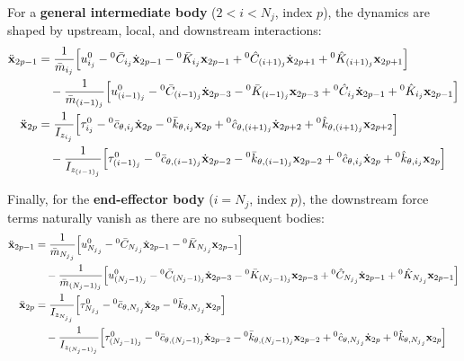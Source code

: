 \documentclass[11pt]{article}
\theoremstyle{definition}
\begin{document}
For a \textbf{general intermediate body} ($2 < i < N_j$, index $p$), the dynamics are shaped by upstream, local, and downstream interactions:
\begin{align}
    \ddot{\mathbf{x}}_{2p-1} &= 
    \frac{1}{\bar{m}_{i_j}} \Big[ u^0_{i_j} - {}^0\bar{C}_{i_j}\dot{\mathbf{x}}_{2p-1} - {}^0\bar{K}_{i_j}\mathbf{x}_{2p-1} + {}^0\hat{C}_{(i+1)_j}\dot{\mathbf{x}}_{2p+1} + {}^0\hat{K}_{(i+1)_j}\mathbf{x}_{2p+1} \Big] \notag \\
    &\quad - \frac{1}{\bar{m}_{(i-1)_j}} \Big[ u^0_{(i-1)_j} - {}^0\bar{C}_{(i-1)_j}\dot{\mathbf{x}}_{2p-3} - {}^0\bar{K}_{(i-1)_j}\mathbf{x}_{2p-3} + {}^0\hat{C}_{i_j}\dot{\mathbf{x}}_{2p-1} + {}^0\hat{K}_{i_j}\mathbf{x}_{2p-1} \Big] \\
    \ddot{\mathbf{x}}_{2p} &= 
    \frac{1}{I_{z_{i_j}}} \Big[ \tau^0_{i_j} - {}^0\bar{c}_{\theta,i_j}\dot{\mathbf{x}}_{2p} - {}^0\bar{k}_{\theta,i_j}\mathbf{x}_{2p} + {}^0\hat{c}_{\theta,(i+1)_j}\dot{\mathbf{x}}_{2p+2} + {}^0\hat{k}_{\theta,(i+1)_j}\mathbf{x}_{2p+2} \Big] \notag \\
    &\quad - \frac{1}{I_{z_{(i-1)_j}}} \Big[ \tau^0_{(i-1)_j} - {}^0\bar{c}_{\theta,(i-1)_j}\dot{\mathbf{x}}_{2p-2} - {}^0\bar{k}_{\theta,(i-1)_j}\mathbf{x}_{2p-2} + {}^0\hat{c}_{\theta,i_j}\dot{\mathbf{x}}_{2p} + {}^0\hat{k}_{\theta,i_j}\mathbf{x}_{2p} \Big]
\end{align}

Finally, for the \textbf{end-effector body} ($i = N_j$, index $p$), the downstream force terms naturally vanish as there are no subsequent bodies:
\begin{align}
    \ddot{\mathbf{x}}_{2p-1} &= 
    \frac{1}{\bar{m}_{{N_j}_j}} \Big[ u^0_{{N_j}_j} - {}^0\bar{C}_{{N_j}_j}\dot{\mathbf{x}}_{2p-1} - {}^0\bar{K}_{{N_j}_j}\mathbf{x}_{2p-1} \Big] \notag \\
    &\quad - \frac{1}{\bar{m}_{({N_j}-1)_j}} \Big[ u^0_{({N_j}-1)_j} - {}^0\bar{C}_{({N_j}-1)_j}\dot{\mathbf{x}}_{2p-3} - {}^0\bar{K}_{({N_j}-1)_j}\mathbf{x}_{2p-3} + {}^0\hat{C}_{{N_j}_j}\dot{\mathbf{x}}_{2p-1} + {}^0\hat{K}_{{N_j}_j}\mathbf{x}_{2p-1} \Big] \\
    \ddot{\mathbf{x}}_{2p} &= 
    \frac{1}{I_{z_{{N_j}_j}}} \Big[ \tau^0_{{N_j}_j} - {}^0\bar{c}_{\theta,{N_j}_j}\dot{\mathbf{x}}_{2p} - {}^0\bar{k}_{\theta,{N_j}_j}\mathbf{x}_{2p} \Big] \notag \\
    &\quad - \frac{1}{I_{z_{({N_j}-1)_j}}} \Big[ \tau^0_{({N_j}-1)_j} - {}^0\bar{c}_{\theta,({N_j}-1)_j}\dot{\mathbf{x}}_{2p-2} - {}^0\bar{k}_{\theta,({N_j}-1)_j}\mathbf{x}_{2p-2} + {}^0\hat{c}_{\theta,{N_j}_j}\dot{\mathbf{x}}_{2p} + {}^0\hat{k}_{\theta,{N_j}_j}\mathbf{x}_{2p} \Big]
\end{align}
\end{document}
